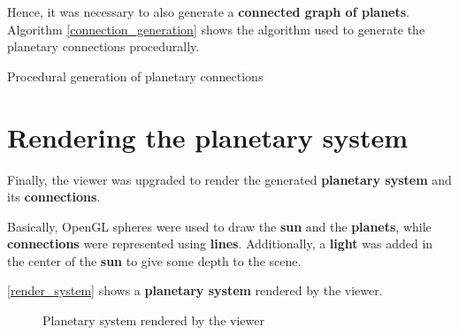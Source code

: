 \documentclass[a4paper,11pt,titlepage,abstract,numbers=noenddot,automark,mnsy,intlimits,rgb,dvipsnames]{report}
\begin{document}
Hence, it was necessary to also generate a \textbf{connected graph of planets}. Algorithm \autoref{connection_generation} shows
the algorithm used to generate the planetary connections procedurally.
\begin{algorithm}[H]
\caption{Procedural generation of planetary connections}
\label{connection_generation}
\begin{algorithmic}
\ENDFOR
\ENDWHILE
\end{algorithmic}
\end{algorithm}
\section{Rendering the planetary system}
Finally, the viewer was upgraded to render the generated \textbf{planetary system} and its \textbf{connections}.

Basically, OpenGL spheres were used to draw the \textbf{sun} and the \textbf{planets}, while \textbf{connections} were represented
using \textbf{lines}. Additionally, a \textbf{light} was added in the center of the \textbf{sun} to give some depth to the scene.

\autoref{render_system} shows a \textbf{planetary system} rendered by the viewer.
\begin{figure}[H]
\noindent{}
\caption{Planetary system rendered by the viewer}
\label{render_system}
\end{figure}
\end{document}
